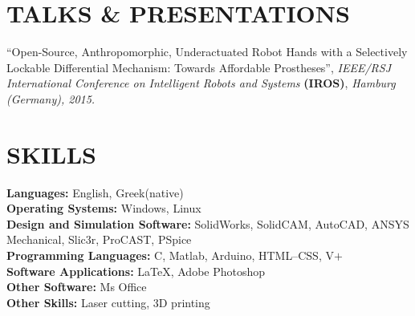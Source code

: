 \documentclass[11pt]{res} %
\begin{document}
\begin{resume}
\vspace{0in} %
\section{TALKS \& PRESENTATIONS} 
\vspace{4pt} %
\textbf {\rbrack \hspace{0.05cm}}``Open-Source, Anthropomorphic, Underactuated Robot Hands with a Selectively Lockable Differential Mechanism: Towards Affordable Prostheses'',
{\it  IEEE/RSJ International Conference on Intelligent Robots and Systems} \small\textbf{(IROS)}, {\it Hamburg (Germany), 2015.}

\section{SKILLS} 
\vspace{4pt} %
\small \textbf  {Languages:} English, Greek(native) 
\\ \small \textbf  {Operating Systems:} Windows, Linux 
\\ \small \textbf {Design and Simulation Software:}
SolidWorks, SolidCAM, AutoCAD, ANSYS Mechanical, Slic3r, ProCAST, PSpice
\\ \small \textbf {Programming Languages:} C, Matlab, Arduino, HTML--CSS, V$+$ 
\\ \small \textbf {Software Applications:} \LaTeX, Adobe Photoshop
\\ \small \textbf {Other Software:} Ms Office
\\ \small \textbf {Other Skills:} Laser cutting, 3D printing
\vspace{0.1in} %

\end{resume}
\end{document}
